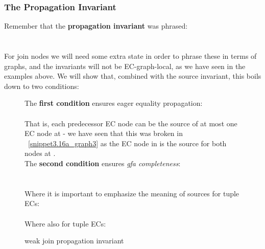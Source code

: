 \subsubsection*{The Propagation Invariant}
Remember that the \textbf{propagation invariant} was phrased:\\
 \\
\\
For join nodes we will need some extra state in order to phrase these in terms of graphs, and the invariants will not be EC-graph-local, as we have seen in the examples above.
We will show that, combined with the source invariant, this boils down to two conditions:
\begin{figure}[H]
The \textbf{first condition} ensures eager equality propagation:\\
\\
That is, each predecessor EC node can be the source of at most one EC node at - 
we have seen that this was broken in ~\ref{snippet3.16a_graph3} as the EC node  in  
is the source for both nodes  at .\\ 
The \textbf{second condition} ensures \emph{gfa completeness}:\\
\\
\\
Where it is important to emphasize the meaning of sources for tuple ECs:\\
\\
Where also for tuple ECs:\\
\caption{weak join propagation invariant}
\label{weak_join_propagation_invariant}
\end{figure}


